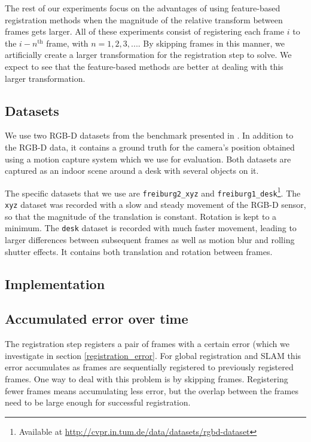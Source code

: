 \documentclass[a4paper]{article}
\begin{document}
The rest of our experiments focus on the advantages of using feature-based registration methods when the magnitude of the relative transform between frames gets larger. All of these experiments consist of registering each frame $i$ to the $i-n^{\mathrm{th}}$ frame, with $n = 1,2,3,...$. By skipping frames in this manner, we artificially create a larger transformation for the registration step to solve. We expect to see that the feature-based methods are better at dealing with this larger transformation.

\subsection{Datasets}

We use two RGB-D datasets from the benchmark presented in \cite{sturm11rss-rgbd}. In addition to the RGB-D data, it contains a ground truth for the camera's position obtained using a motion capture system which we use for evaluation. Both datasets are captured as an indoor scene around a desk with several objects on it.

The specific datasets that we use are \texttt{freiburg2\_xyz} and \texttt{freiburg1\_desk}\footnote{Available at \url{http://cvpr.in.tum.de/data/datasets/rgbd-dataset}}. The \texttt{xyz} dataset was recorded with a slow and steady movement of the RGB-D sensor, so that the magnitude of the translation is constant. Rotation is kept to a minimum. The \texttt{desk} dataset is recorded with much faster movement, leading to larger differences between subsequent frames as well as motion blur and rolling shutter effects. It contains both translation and rotation between frames.

\subsection{Implementation}




\subsection{Accumulated error over time}
\label{accumulated_error}

The registration step registers a pair of frames with a certain error (which we investigate in section \ref{registration_error}. For global registration and \ac{SLAM} this error accumulates as frames are sequentially registered to previously registered frames. One way to deal with this problem is by skipping frames. Registering fewer frames means accumulating less error, but the overlap between the frames need to be large enough for successful registration. 
\end{document}
